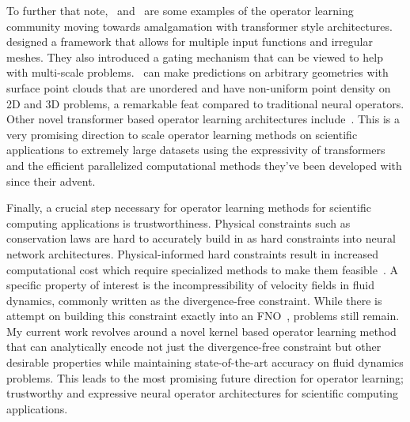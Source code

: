 To further that note,~\citep{hao2023gnot} and~\citep{liu2025geometry} are some examples of the operator learning community moving towards amalgamation with transformer style architectures.~\citep{hao2023gnot} designed a framework that allows for multiple input functions and irregular meshes. They also introduced a gating mechanism that can be viewed to help with multi-scale problems.~\citep{liu2025geometry} can make predictions on arbitrary geometries with surface point clouds that are unordered and have non-uniform point density on 2D and 3D problems, a remarkable feat compared to traditional neural operators. Other novel transformer based operator learning architectures include~\citep{cao2021choose, liu2024mitigating, li2022transformer}. This is a very promising direction to scale operator learning methods on scientific applications to extremely large datasets using the expressivity of transformers and the efficient parallelized computational methods they've been developed with since their advent.

Finally, a crucial step necessary for operator learning methods for scientific computing applications is trustworthiness. Physical constraints such as conservation laws are hard to accurately build in as hard constraints into neural network architectures. Physical-informed hard constraints result in increased computational cost which require specialized methods to make them feasible~\citep{chalapathi2024scaling}. A specific property of interest is the incompressibility of velocity fields in fluid dynamics, commonly written as the divergence-free constraint. While there is attempt on building this constraint exactly into an FNO~\citep{khorrami2024physics}, problems still remain. My current work revolves around a novel kernel based operator learning method that can analytically encode not just the divergence-free constraint but other desirable properties while maintaining state-of-the-art accuracy on fluid dynamics problems. This leads to the most promising future direction for operator learning; trustworthy and expressive neural operator architectures for scientific computing applications.
%
\pagebreak
